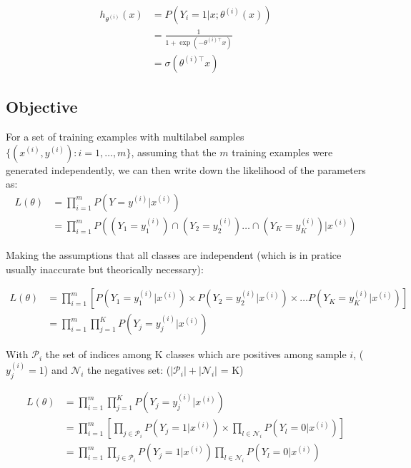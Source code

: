 \begin{align}
	h_{\theta^{(i)}}(x) 
	&= P(Y_i = 1 | x; \theta^{(i)}(x)) \\
	&= \frac{1}{1 + \exp(-\theta^{(i)\top} x)}\\
	&= \sigma(\theta^{(i)\top} x)
\end{align}




\subsection{Objective}


For a set of training examples with multilabel samples $\{ (x^{(i)}, y^{(i)}) : i=1,\ldots,m\}$, assuming that the $m$ training examples were generated independently, we can then write down the likelihood of the parameters as:
\begin{align}
	L(\theta) &= \prod_{i=1}^m P(Y=y^{(i)} | x^{(i)} ) \\
			  &= \prod_{i=1}^m P((Y_1=y_1^{(i)}) \cap (Y_2=y_2^{(i)}) \dots \cap (Y_K=y_K^{(i)})| x^{(i)})
\end{align}

Making the assumptions that all classes are independent (which is in pratice usually inaccurate but theorically necessary):

\begin{align}
	L(\theta) &= \prod_{i=1}^m \left[ P(Y_1=y_1^{(i)} | x^{(i)}) \times P(Y_2=y_2^{(i)} | x^{(i)}) \times \dots P(Y_K=y_K^{(i)} | x^{(i)}) \right] \\
			  &= \prod_{i=1}^m \prod_{j=1}^K P(Y_j=y_j^{(i)} | x^{(i)}) 
\end{align}

With $\mathcal{P}_i$ the set of indices among K classes which are positives among sample $i$, ($y_j^{(i)}=1$) and $\mathcal{N}_i$ the negatives set: ($|\mathcal{P}_i| + |\mathcal{N}_i|$ = K)

\begin{align}
	L(\theta) &= \prod_{i=1}^m \prod_{j=1}^K P(Y_j=y_j^{(i)} | x^{(i)}) \\
			  &= \prod_{i=1}^m \left[ \prod_{j \in \mathcal{P}_i } P(Y_j=1 | x^{(i)}) \times \prod_{l \in \mathcal{N}_i} P(Y_l=0 | x^{(i)}) \right] \\
			  &= \prod_{i=1}^m  \prod_{j \in \mathcal{P}_i } P(Y_j=1 | x^{(i)}) \prod_{l \in \mathcal{N}_i} P(Y_l=0 | x^{(i)})  \\
\end{align}


